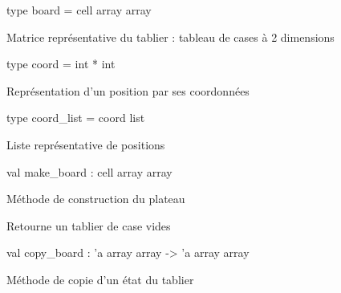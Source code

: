 \documentclass[11pt]{article}
\begin{document}
\label{type:Othello.board}\begin{ocamldoccode}
type board = cell array array 
\end{ocamldoccode}
\begin{ocamldocdescription}
Matrice représentative du tablier : tableau de cases à 2 dimensions


\end{ocamldocdescription}




\label{type:Othello.coord}\begin{ocamldoccode}
type coord = int * int 
\end{ocamldoccode}
\begin{ocamldocdescription}
Représentation d'un position par ses coordonnées


\end{ocamldocdescription}




\label{type:Othello.coord-underscorelist}\begin{ocamldoccode}
type coord_list = coord list 
\end{ocamldoccode}
\begin{ocamldocdescription}
Liste représentative de positions


\end{ocamldocdescription}




\label{val:Othello.make-underscoreboard}\begin{ocamldoccode}
val make_board : cell array array
\end{ocamldoccode}
\begin{ocamldocdescription}
Méthode de construction du plateau


\end{ocamldocdescription}




Retourne un tablier de case vides



\label{val:Othello.copy-underscoreboard}\begin{ocamldoccode}
val copy_board : 'a array array -> 'a array array
\end{ocamldoccode}
\begin{ocamldocdescription}
Méthode de copie d'un état du tablier


\end{ocamldocdescription}
\end{document}
